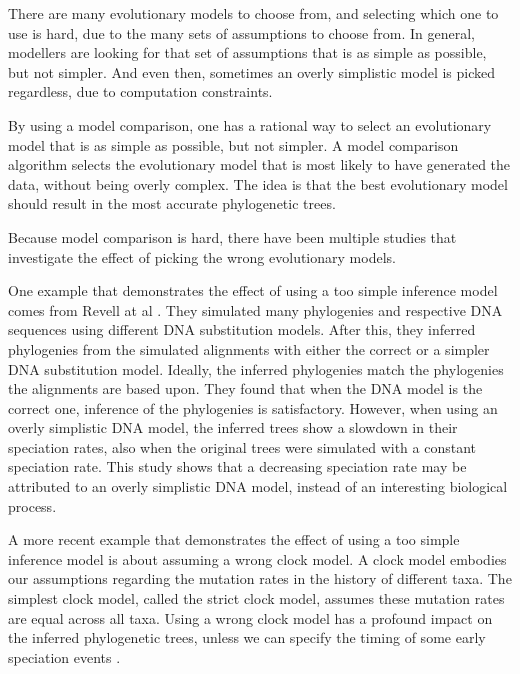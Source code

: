 There are many evolutionary models to choose from, 
and selecting which one to use is hard, due to the many sets of assumptions
to choose from. In general, modellers are looking for that set of assumptions
that is as simple as possible, but not simpler. And even then, sometimes
an overly simplistic model is picked regardless, due to computation 
constraints. 

By using a model comparison, one has a rational way to select 
an evolutionary model that is as simple as possible, but not simpler.
A model comparison algorithm selects the evolutionary model that is
most likely to have generated the data, without being overly complex.
The idea is that the best evolutionary model should result in the
most accurate phylogenetic trees.

Because model comparison is hard, there have been multiple
studies that investigate the effect of picking the wrong
evolutionary models. 

%
%
%

One example that demonstrates the effect of using a too simple inference model
comes from Revell at al \cite{revell2005under}.
They simulated many phylogenies and respective DNA sequences 
using different DNA substitution models. 
After this, they inferred phylogenies from the simulated alignments
with either the correct or a simpler DNA substitution model. 
Ideally, the inferred phylogenies match the phylogenies the alignments are based upon.
They found that when the DNA model is the correct one, inference of the
phylogenies is satisfactory.
However, when using an overly simplistic DNA model, 
the inferred trees show a slowdown in their speciation rates, 
also when the original trees were simulated with a constant speciation rate.
This study shows that a decreasing speciation rate may be attributed
to an overly simplistic DNA model, instead of an interesting biological process.

%
%

A more recent example that demonstrates the effect of using a too simple 
inference model is about assuming a wrong clock model. 
A clock model embodies our assumptions regarding the mutation rates in
the history of different taxa. The simplest clock model, called the strict
clock model, assumes these mutation rates are equal across all taxa.
Using a wrong clock model has a profound impact 
on the inferred phylogenetic trees, unless we can
specify the timing of some early speciation events \cite{duchene2014impact}.

